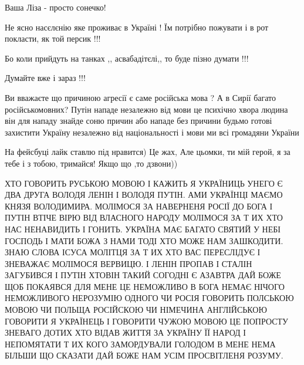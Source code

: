 \begin{itemize}
Ваша Ліза - просто сонечко!

 
Не ясно насєлєнію яке проживає в Україні ! Їм потрібно пожувати і в рот покласти, як той персик !!!

Бо коли прийдуть на танках ,, асвабадітєлі,, то буде пізно думати !!!

Думайте вже і зараз !!!

 

Ви вважаєте що причиною агресії є саме російська мова ? А в Сирії багато
російськомовних? Путін нападе незалежно від мови це психічно хвора людина він
для нападу знайде соню причин або нападе без причини будьмо готові захистити
Україну незалежно від національності і мови ми всі громадяни України

 
На фейсбуці лайк ставлю під нравится) Це жах, Але цьомки, ти мій герой, я за
тебе і з тобою, тримайся! Якщо що ,то дзвони))

 

\obeycr
ХТО ГОВОРИТЬ РУСЬКОЮ МОВОЮ
І КАЖИТЬ Я УКРАЇНИЦЬ
УНЕГО Є ДВА ДРУГА
ВОЛОДЯ ЛЕНІН
І ВОЛОДЯ ПУТІН.
АМИ УКРАЇНЦІ
МАЄМО КНЯЗЯ
ВОЛОДИМИРА.
МОЛІМОСЯ ЗА НАВЕРНЕНЯ
РОСІЇ ДО БОГА
І ПУТІН ВТІЧЕ ВІРЮ ВІД
ВЛАСНОГО НАРОДУ
МОЛІМОСЯ ЗА Т ИХ
ХТО НАС НЕНАВИДИТЬ
І ГОНИТЬ.
УКРАЇНА МАЄ
БАГАТО СВЯТИЙ
У НЕБІ
ГОСПОДЬ І МАТИ
БОЖА З НАМИ ТОДІ
ХТО МОЖЕ НАМ
ЗАШКОДИТИ.
ЗНАЮ СЛОВА ІСУСА
МОЛІТЦЯ ЗА Т ИХ
ХТО ВАС ПЕРЕСЛІДУЄ
І ЗНЕВАЖАЄ
МОЛІМОСЯ ВЕРВИЦЮ.
І ЛЕНІН ПРОПАВ
І СТАЛІН ЗАГУБИВСЯ
І ПУТІН ХТОВІН ТАКИЙ
СОГОДНІ Є АЗАВТРА
ДАЙ БОЖЕ ЩОБ
ПОКАЯВСЯ ДЛЯ МЕНЕ
ЦЕ НЕМОЖЛИВО
В БОГА НЕМАЄ НІЧОГО
НЕМОЖЛИВОГО
НЕРОЗУМІЮ ОДНОГО
ЧИ РОСІЯ ГОВОРИТЬ
ПОЛСЬКОЮ МОВОЮ
ЧИ ПОЛЬЩА РОСІЙСКОЮ
ЧИ НІМЕЧИНА
АНГЛІЙСЬКОЮ
ГОВОРИТИ
Я УКРАЇНЕЦЬ
І ГОВОРИТИ ЧУЖОЮ
МОВОЮ
ЦЕ ПОПРОСТУ
ЗНЕВАГО ДОТИХ
ХТО ВІДАВ
ЖИТТЯ ЗА УКРАЇНУ
ЇЇ НАРОД
І НЕПОМЯТАТИ
Т ИХ КОГО ЗАМОРДУВАЛИ ГОЛОДОМ
В МЕНЕ НЕМА
БІЛЬШИ ЩО
СКАЗАТИ
ДАЙ БОЖЕ НАМ
УСІМ ПРОСВІТЛЕНЯ
РОЗУМУ.
\restorecr


\end{itemize}
